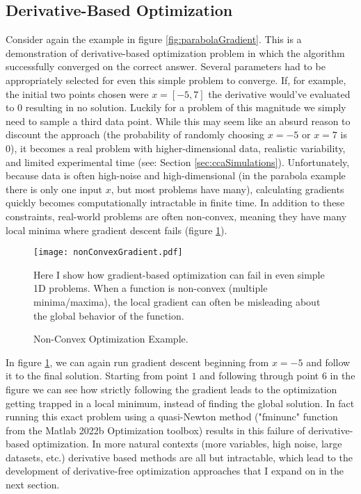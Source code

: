 \subsection{Derivative-Based Optimization}
\label{sec:DerivB}
Consider again the example in figure \ref{fig:parabolaGradient}. This is a demonstration of derivative-based optimization problem in which the algorithm successfully converged on the correct answer. Several parameters had to be appropriately selected for even this simple problem to converge. If, for example, the initial two points chosen were $x=[-5, 7]$ the derivative would've evaluated to $0$ resulting in no solution. Luckily for a problem of this magnitude we simply need to sample a third data point. While this may seem like an absurd reason to discount the approach (the probability of randomly choosing $x=-5$ or $x=7$ is 0), it becomes a real problem with higher-dimensional data, realistic variability, and limited experimental time (see: Section \ref{sec:ccaSimulations}). Unfortunately, because data is often high-noise and high-dimensional (in the parabola example there is only one input $x$, but most problems have many), calculating gradients quickly becomes computationally intractable in finite time. In addition to these constraints, real-world problems are often non-convex, meaning they have many local minima where gradient descent fails (figure \ref{fig:nonConvexGradient}). 

\begin{figure}[h]
	\centering
	\texttt{[image: nonConvexGradient.pdf]} 
	\caption{Non-Convex Optimization Example.}{Here I show how gradient-based optimization can fail in even simple 1D problems. When a function is non-convex (multiple minima/maxima), the local gradient can often be misleading about the global behavior of the function.}
	\label{fig:nonConvexGradient}
\end{figure}

In figure \ref{fig:nonConvexGradient}, we can again run gradient descent beginning from $x=-5$ and follow it to the final solution. Starting from point $1$ and following through point $6$ in the figure we can see how strictly following the gradient leads to the optimization getting trapped in a local minimum, instead of finding the global solution. In fact running this exact problem using a quasi-Newton method ("fminunc" function from the Matlab 2022b Optimization toolbox) results in this failure of derivative-based optimization. In more natural contexts (more variables, high noise, large datasets, etc.) derivative based methods are all but intractable, which lead to the development of derivative-free optimization approaches that I expand on in the next section.

